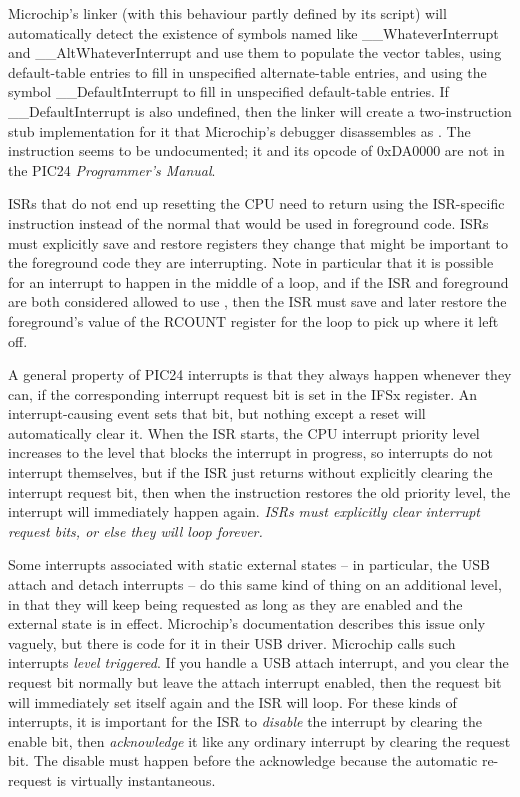 Microchip's linker (with this behaviour partly defined by its script) will
automatically detect the existence of symbols named like
\_\_WhateverInterrupt and \_\_AltWhateverInterrupt and use them to populate
the vector tables, using default-table entries to fill in unspecified
alternate-table entries, and using the symbol \_\_DefaultInterrupt to fill
in unspecified default-table entries.  If \_\_DefaultInterrupt is also
undefined, then the linker will create a two-instruction stub implementation
for it that Microchip's debugger disassembles as  . 
The  instruction seems to be undocumented; it and its opcode of
0xDA0000 are not in the PIC24 \emph{Programmer's Manual}.

ISRs that do not end up resetting the CPU need to return using the
ISR-specific  instruction instead of the normal 
that would be used in foreground code.  ISRs must explicitly save and
restore registers they change that might be important to the foreground code
they are interrupting.  Note in particular that it is possible for an
interrupt to happen in the middle of a  loop, and if the ISR
and foreground are both considered allowed to use , then the
ISR must save and later restore the foreground's value of the RCOUNT
register for the loop to pick up where it left off.

A general property of PIC24 interrupts is that they always happen whenever
they can, if the corresponding interrupt request bit is set in the IFSx
register.  An interrupt-causing event sets that bit, but nothing except a
reset will automatically clear it.  When the ISR starts, the CPU interrupt
priority level increases to the level that blocks the interrupt in progress,
so interrupts do not interrupt themselves, but if the ISR just returns
without explicitly clearing the interrupt request bit, then when the
 instruction restores the old priority level, the interrupt
will immediately happen again.  \emph{ISRs must explicitly clear interrupt
request bits, or else they will loop forever.}

Some interrupts associated with static external states -- in particular, the
USB attach and detach interrupts -- do this same kind of thing on an
additional level, in that they will keep being requested as long as they are
enabled and the external state is in effect.  Microchip's documentation
describes this issue only vaguely, but there is code for it in their USB
driver.  Microchip calls such interrupts \emph{level triggered}.  If you
handle a USB attach interrupt, and you clear the request bit normally but
leave the attach interrupt enabled, then the request bit will immediately
set itself again and the ISR will loop.  For these kinds of interrupts, it
is important for the ISR to \emph{disable} the interrupt by clearing the
enable bit, then \emph{acknowledge} it like any ordinary interrupt by
clearing the request bit.  The disable must happen before the acknowledge
because the automatic re-request is virtually instantaneous.

